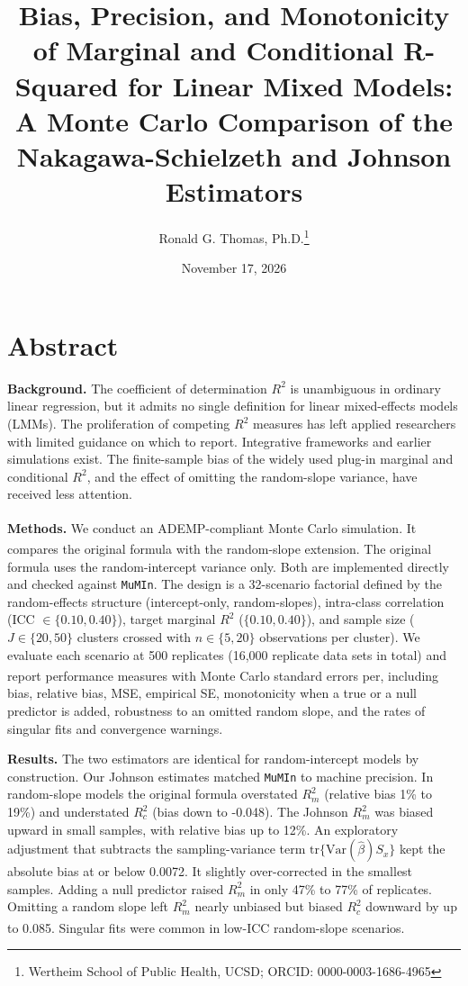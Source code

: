 \documentclass[
  11pt,
]{article}
\title{Bias, Precision, and Monotonicity of Marginal and Conditional R-Squared for Linear Mixed Models: A Monte Carlo Comparison of the Nakagawa-Schielzeth and Johnson Estimators}
\author{Ronald G. Thomas, Ph.D.\thanks{Wertheim School of Public Health, UCSD; ORCID: 0000-0003-1686-4965}}
\date{November 17, 2026}
\begin{document}
\maketitle

{
\setcounter{tocdepth}{2}
\tableofcontents
}
\section{Abstract}\label{abstract}

\textbf{Background.} The coefficient of determination \(R^2\) is
unambiguous in ordinary linear regression, but it admits no
single definition for linear mixed-effects models (LMMs). The
proliferation of competing \(R^2\) measures has left applied
researchers with limited guidance on which to report. Integrative
frameworks and earlier simulations exist. The finite-sample bias
of the widely used plug-in marginal and conditional \(R^2\), and the
effect of omitting the random-slope variance, have received less
attention.

\textbf{Methods.} We conduct an ADEMP-compliant Monte Carlo simulation\textsuperscript{}. It compares the original\textsuperscript{} formula with the\textsuperscript{} random-slope extension.
The original formula uses the random-intercept variance only.
Both are implemented directly and checked against \texttt{MuMIn}. The
design is a 32-scenario factorial defined by the random-effects
structure (intercept-only, random-slopes), intra-class correlation
(ICC \(\in \{0.10, 0.40\}\)), target marginal \(R^2\)
(\(\{0.10, 0.40\}\)), and sample size (\(J \in \{20, 50\}\)
clusters crossed with \(n \in \{5, 20\}\) observations per cluster).
We evaluate each scenario at 500 replicates
(16,000 replicate data sets in
total) and
report performance measures with Monte Carlo standard errors
per\textsuperscript{}, including bias, relative
bias, MSE, empirical SE, monotonicity when a true or a null
predictor is added, robustness to an omitted random slope, and
the rates of singular fits and convergence warnings.

\textbf{Results.} The two estimators are identical for
random-intercept models by construction. Our Johnson estimates
matched \texttt{MuMIn} to machine precision. In random-slope models the
original formula overstated \(R^2_m\) (relative bias
1\% to 19\%) and
understated \(R^2_c\) (bias down to
-0.048). The Johnson \(R^2_m\) was biased
upward in small samples, with relative bias up to
12\%. An exploratory adjustment that subtracts
the sampling-variance term \(\text{tr}\{\text{Var}(\hat\beta) S_x\}\)
kept the absolute bias at or below
0.0072.
It slightly over-corrected in the smallest samples. Adding a null predictor
raised \(R^2_m\) in only 47\% to
77\% of replicates. Omitting a random slope
left \(R^2_m\) nearly unbiased but biased \(R^2_c\) downward by up to
0.085. Singular fits were common in
low-ICC random-slope scenarios\textsuperscript{}.
\end{document}
